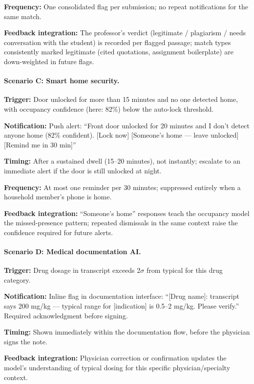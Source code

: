 \textbf{Frequency:} One consolidated flag per submission; no repeat notifications for the same match.

\textbf{Feedback integration:} The professor's verdict (legitimate / plagiarism / needs conversation with the student) is recorded per flagged passage; match types consistently marked legitimate (cited quotations, assignment boilerplate) are down-weighted in future flags.

\paragraph{Scenario C: Smart home security.}

\textbf{Trigger:} Door unlocked for more than 15 minutes and no one detected home, with occupancy confidence (here: 82\%) below the auto-lock threshold.

\textbf{Notification:} Push alert: ``Front door unlocked for 20 minutes and I don't detect anyone home (82\% confident). [Lock now] [Someone's home --- leave unlocked] [Remind me in 30 min]''

\textbf{Timing:} After a sustained dwell (15--20 minutes), not instantly; escalate to an immediate alert if the door is still unlocked at night.

\textbf{Frequency:} At most one reminder per 30 minutes; suppressed entirely when a household member's phone is home.

\textbf{Feedback integration:} ``Someone's home'' responses teach the occupancy model the missed-presence pattern; repeated dismissals in the same context raise the confidence required for future alerts.

\paragraph{Scenario D: Medical documentation AI.}

\textbf{Trigger:} Drug dosage in transcript exceeds 2$\sigma$ from typical for this drug category.

\textbf{Notification:} Inline flag in documentation interface: ``[Drug name]: transcript says 200 mg/kg --- typical range for [indication] is 0.5--2 mg/kg. Please verify.'' Required acknowledgment before signing.

\textbf{Timing:} Shown immediately within the documentation flow, before the physician signs the note.

\textbf{Feedback integration:} Physician correction or confirmation updates the model's understanding of typical dosing for this specific physician/specialty context.

